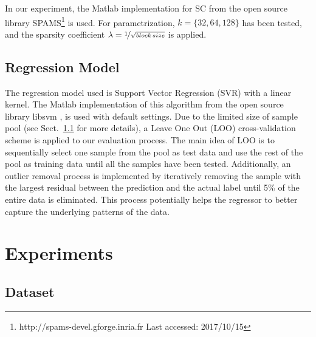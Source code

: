 \documentclass{ws-ijsc}
\begin{document}
In our experiment, the Matlab implementation for SC from the open source library SPAMS\footnote{http://spams-devel.gforge.inria.fr Last accessed: 2017/10/15}\cite{Mairal2009a} is used. For parametrization, $k = \{32, 64, 128\}$ has been tested, and the sparsity coefficient $\lambda = \nicefrac{1}{\sqrt{block\, size}}$ is applied. 

\subsection{Regression Model}
The regression model used is Support Vector Regression (SVR) with a linear kernel. The Matlab implementation of this algorithm from the  open source library  libsvm \cite{Chang2011}, is used with default settings. Due to the limited size of sample pool (see Sect.~\ref{subsec:dataset} for more details), a Leave One Out (LOO) cross-validation scheme is applied to our evaluation process. The main idea of LOO is to sequentially select one sample from the pool as test data and use the rest of the pool as training data until all the samples have been tested. Additionally, an outlier removal process is implemented by iteratively removing the sample with the largest residual between the prediction and the actual label until 5\% of the entire data is eliminated. This process potentially helps the regressor to better capture the underlying patterns of the data.  

\section{Experiments}\label{sec:experiments}
\subsection{Dataset}\label{subsec:dataset}
\end{document}
